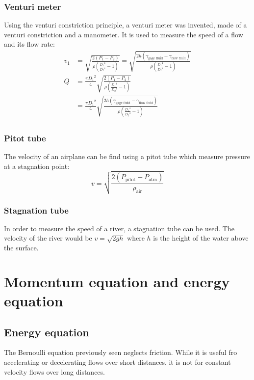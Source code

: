 \documentclass[10pt, twocolumn]{article}
\begin{document}
\subsubsection{Venturi meter}
Using the venturi constriction principle, a venturi meter was invented, made of a venturi constriction and a manometer.
It is used to measure the speed of a flow and its flow rate:
\begin{align*}
  v_1 & = \sqrt{\frac{2 \left( P_1 - P_2 \right)}{\rho \left( \frac{{D_1}^4}{{D_2}^4} - 1 \right)}} = \sqrt{\frac{2 h \left( \gamma_\text{gage fluid} - \gamma_\text{flow fluid} \right)}{\rho \left( \frac{{D_1}^4}{{D_2}^4} - 1 \right)}} \\
  Q   & = \frac{\pi {D_1}^2}{4} \sqrt{\frac{2 \left( P_1 - P_2 \right)}{\rho \left( \frac{{D_1}^4}{{D_2}^4} - 1 \right)}}                                                                                                                   \\
      & = \frac{\pi {D_1}^2}{4} \sqrt{\frac{2 h \left( \gamma_\text{gage fluid} - \gamma_\text{flow fluid} \right)}{\rho \left( \frac{{D_1}^4}{{D_2}^4} - 1 \right)}}                                                                       \\
\end{align*}


\subsubsection{Pitot tube}
The velocity of an airplane can be find using a pitot tube which measure pressure at a stagnation point:
\[
  v = \sqrt{\frac{2 \left( P_\mathrm{pitot} - P_\mathrm{atm} \right)}{\rho_\mathrm{air}}}
\]


\subsubsection{Stagnation tube}
In order to measure the speed of a river, a stagnation tube can be used.
The velocity of the river would be \(v = \sqrt{2gh}\) where \(h\) is the height of the water above the surface.


\section{Momentum equation and energy equation}
\subsection{Energy equation}
The Bernoulli equation previously seen neglects friction.
While it is useful fro accelerating or decelerating flows over short distances, it is not for constant velocity flows over long distances.
\end{document}
